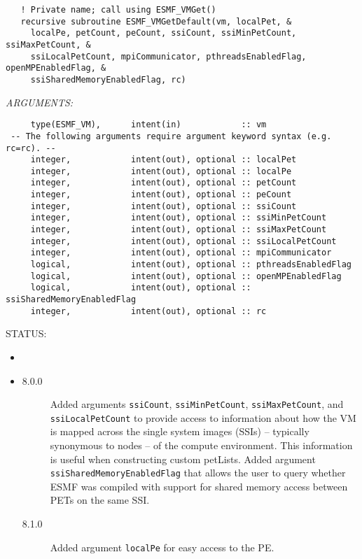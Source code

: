  
\begin{verbatim}   ! Private name; call using ESMF_VMGet()
   recursive subroutine ESMF_VMGetDefault(vm, localPet, &
     localPe, petCount, peCount, ssiCount, ssiMinPetCount, ssiMaxPetCount, &
     ssiLocalPetCount, mpiCommunicator, pthreadsEnabledFlag, openMPEnabledFlag, &
     ssiSharedMemoryEnabledFlag, rc)\end{verbatim}{\em ARGUMENTS:}
\begin{verbatim}     type(ESMF_VM),      intent(in)            :: vm
 -- The following arguments require argument keyword syntax (e.g. rc=rc). --
     integer,            intent(out), optional :: localPet
     integer,            intent(out), optional :: localPe
     integer,            intent(out), optional :: petCount
     integer,            intent(out), optional :: peCount
     integer,            intent(out), optional :: ssiCount
     integer,            intent(out), optional :: ssiMinPetCount
     integer,            intent(out), optional :: ssiMaxPetCount
     integer,            intent(out), optional :: ssiLocalPetCount
     integer,            intent(out), optional :: mpiCommunicator
     logical,            intent(out), optional :: pthreadsEnabledFlag
     logical,            intent(out), optional :: openMPEnabledFlag
     logical,            intent(out), optional :: ssiSharedMemoryEnabledFlag
     integer,            intent(out), optional :: rc\end{verbatim}
{\sf STATUS:}
   \begin{itemize}
   \item{}
   \item{}
   \begin{description}
   \item[8.0.0] Added arguments {\tt ssiCount}, {\tt ssiMinPetCount}, 
     {\tt ssiMaxPetCount}, and {\tt ssiLocalPetCount} to provide access 
     to information about how the VM is mapped across the single system images
     (SSIs) -- typically synonymous to nodes -- of the compute environment. This
     information is useful when constructing custom petLists. \newline
     Added argument {\tt ssiSharedMemoryEnabledFlag} that allows the user to 
     query whether ESMF was compiled with support for shared memory 
     access between PETs on the same SSI.
   \item[8.1.0] Added argument {\tt localPe} for easy access to the PE.
   \end{description}
   \end{itemize}
  
